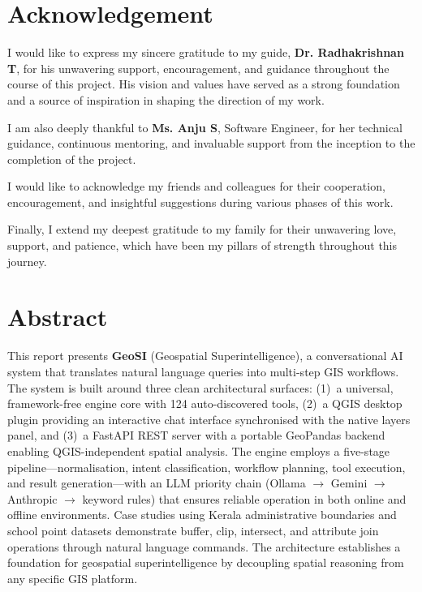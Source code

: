 \documentclass[12pt,a4paper]{report}
\begin{document}
\chapter*{Acknowledgement}

I would like to express my sincere gratitude to my guide, \textbf{Dr. Radhakrishnan T}, for his unwavering support, encouragement, and guidance throughout the course of this project. His vision and values have served as a strong foundation and a source of inspiration in shaping the direction of my work.

\vspace{0.5cm}

I am also deeply thankful to \textbf{Ms. Anju S}, Software Engineer, for her technical guidance, continuous mentoring, and invaluable support from the inception to the completion of the project.

\vspace{0.5cm}

I would like to acknowledge my friends and colleagues for their cooperation, encouragement, and insightful suggestions during various phases of this work.

\vspace{0.5cm}

Finally, I extend my deepest gratitude to my family for their unwavering love, support, and patience, which have been my pillars of strength throughout this journey.

\newpage

\chapter*{Abstract}

This report presents \textbf{GeoSI} (Geospatial Superintelligence), a conversational AI system that translates natural language queries into multi-step GIS workflows.  The system is built around three clean architectural surfaces: (1)~a universal, framework-free engine core with 124 auto-discovered tools, (2)~a QGIS desktop plugin providing an interactive chat interface synchronised with the native layers panel, and (3)~a FastAPI REST server with a portable GeoPandas backend enabling QGIS-independent spatial analysis.  The engine employs a five-stage pipeline---normalisation, intent classification, workflow planning, tool execution, and result generation---with an LLM priority chain (Ollama $\rightarrow$ Gemini $\rightarrow$ Anthropic $\rightarrow$ keyword rules) that ensures reliable operation in both online and offline environments.  Case studies using Kerala administrative boundaries and school point datasets demonstrate buffer, clip, intersect, and attribute join operations through natural language commands.  The architecture establishes a foundation for geospatial superintelligence by decoupling spatial reasoning from any specific GIS platform.
\end{document}
